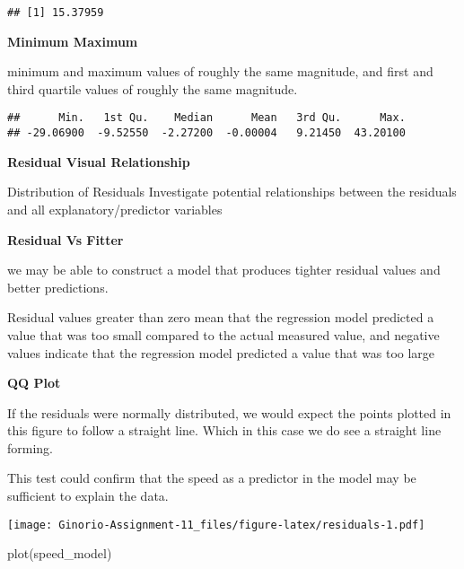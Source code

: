 \documentclass[
]{article}
\newenvironment{Shaded}{\begin{snugshade}}{\end{snugshade}}
\newcommand{\FunctionTok}[1]{\textcolor[rgb]{0.00,0.00,0.00}{#1}}
\newcommand{\NormalTok}[1]{#1}
\newcommand{\SpecialCharTok}[1]{\textcolor[rgb]{0.00,0.00,0.00}{#1}}
\begin{document}
\begin{verbatim}
## [1] 15.37959
\end{verbatim}

\textbf{Minimum Maximum}

minimum and maximum values of roughly the same magnitude, and first and
third quartile values of roughly the same magnitude.

\begin{Shaded}
\end{Shaded}

\begin{verbatim}
##      Min.   1st Qu.    Median      Mean   3rd Qu.      Max. 
## -29.06900  -9.52550  -2.27200  -0.00004   9.21450  43.20100
\end{verbatim}

\textbf{Residual Visual Relationship}

Distribution of Residuals Investigate potential relationships between
the residuals and all explanatory/predictor variables

\textbf{Residual Vs Fitter}

we may be able to construct a model that produces tighter residual
values and better predictions.

Residual values greater than zero mean that the regression model
predicted a value that was too small compared to the actual measured
value, and negative values indicate that the regression model predicted
a value that was too large

\textbf{QQ Plot}

If the residuals were normally distributed, we would expect the points
plotted in this figure to follow a straight line. Which in this case we
do see a straight line forming.

This test could confirm that the speed as a predictor in the model may
be sufficient to explain the data.

\texttt{[image: Ginorio-Assignment-11\_files/figure-latex/residuals-1.pdf]}

\begin{Shaded}
\begin{Highlighting}[]
\FunctionTok{plot}\NormalTok{(speed\_model)}
\end{Highlighting}
\end{Shaded}
\end{document}
